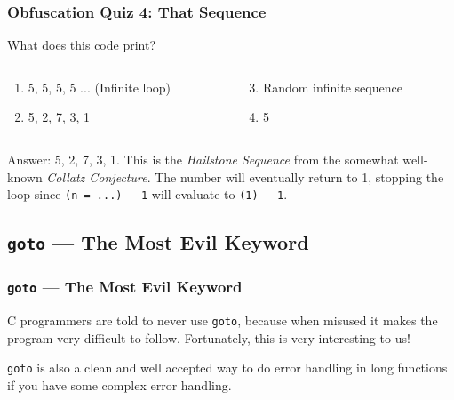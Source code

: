 \documentclass[xcolor]{beamer}
\begin{document}
\begin{frame}
	\frametitle{Obfuscation Quiz 4: That Sequence}
	\pause
	
	What does this code print?
	
	
	\pause
	
	\begin{columns}
		\begin{column}{0.45\textwidth}
			\begin{enumerate}
				\item 5, 5, 5, 5 ... (Infinite loop)
				\pause
				\item 5, 2, 7, 3, 1
			\end{enumerate}
		\end{column}
		\pause
		\begin{column}{0.45\textwidth}
			\begin{enumerate}
				\setcounter{enumi}{2}
				\item Random infinite sequence
				\pause
				\item 5
			\end{enumerate}
		\end{column}
	\end{columns}
	\pause
	
	\vspace{0.5cm}
	
	Answer: 5, 2, 7, 3, 1. \pause This is the \textit{Hailstone Sequence} from the somewhat well-known \textit{Collatz Conjecture}. \pause The number will eventually return to 1, stopping the loop since \texttt{(n = ...) - 1} will evaluate to \texttt{(1) - 1}.
\end{frame}

\subsection{\texttt{goto} --- The Most Evil Keyword}

\begin{frame}
	\frametitle{\texttt{goto} --- The Most Evil Keyword}
	\pause
	
	\small
	C programmers are told to never use \texttt{goto}, because when misused it makes the program very difficult to follow. Fortunately, this is very interesting to us!
	\pause
	
	\texttt{goto} is also a clean and well accepted way to do error handling in long functions if you have some complex error handling.
	
	
\end{frame}
\end{document}
